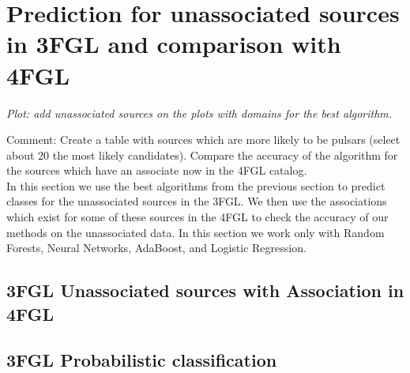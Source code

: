 \section{Prediction for unassociated sources in 3FGL and comparison with 4FGL}



{\it Plot: add unassociated sources on the plots with domains for the best algorithm.}

Comment: Create a table with sources which are more likely to be pulsars (select about 20 the most likely candidates).
Compare the accuracy of the algorithm for the sources which have an associate now in the 4FGL catalog.\\

In this section we use the best algorithms from the previous section to predict classes for the unassociated sources in the 3FGL. We then use the associations which exist for some of these sources in the 4FGL to check the accuracy of our methods on the unassociated data. In this section we work only with Random Forests, Neural Networks, AdaBoost, and Logistic Regression. \\


\subsection{3FGL Unassociated sources with Association in 4FGL}



\subsection{3FGL Probabilistic classification} 

